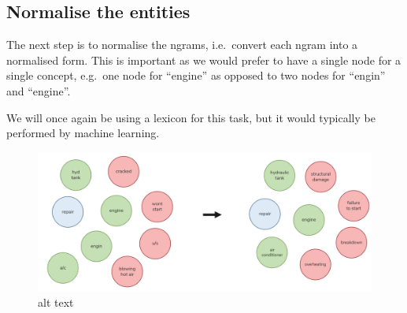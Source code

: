 \documentclass[11pt]{article}
\begin{document}
    \hypertarget{normalise-the-entities}{%
\subsection{Normalise the entities}\label{normalise-the-entities}}

The next step is to normalise the ngrams, i.e.~convert each ngram into a
normalised form. This is important as we would prefer to have a single
node for a single concept, e.g.~one node for ``engine'' as opposed to
two nodes for ``engin'' and ``engine''.

We will once again be using a lexicon for this task, but it would
typically be performed by machine learning.

\begin{figure}
\centering
\includegraphics{images/normalising-entities.png}
\caption{alt text}
\end{figure}
\end{document}
